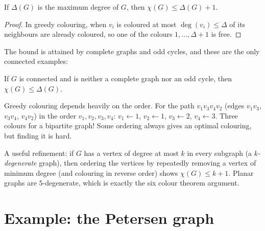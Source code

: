 \begin{theorem}
If $\Delta(G)$ is the maximum degree of $G$, then $\chi(G)\le\Delta(G)+1$.
\end{theorem}
\begin{proof}
In greedy colouring, when $v_i$ is coloured at most $\deg(v_i) \le \Delta$ of its neighbours are
already coloured, so one of the colours $1, \dots, \Delta + 1$ is free.
\end{proof}

The bound is attained by complete graphs and odd cycles, and these are the only connected
examples:

\begin{theorem}
If $G$ is connected and is neither a complete graph nor an odd cycle, then $\chi(G)\le\Delta(G)$.
\end{theorem}

\begin{important}[Pitfall]
Greedy colouring depends heavily on the order. For the path $v_1v_3v_4v_2$ (edges $v_1v_3$,
$v_3v_4$, $v_4v_2$) in the order $v_1, v_2, v_3, v_4$: $v_1 \gets 1$, $v_2 \gets 1$, $v_3 \gets 2$,
$v_4 \gets 3$. Three colours for a bipartite graph! Some ordering always gives an optimal colouring,
but finding it is hard.
\end{important}

\begin{center}
\end{center}

A useful refinement: if $G$ has a vertex of degree at most $k$ in every subgraph (a
\emph{$k$-degenerate} graph), then ordering the vertices by repeatedly removing a vertex of
minimum degree (and colouring in reverse order) shows $\chi(G) \le k + 1$. Planar graphs are
$5$-degenerate, which is exactly the six colour theorem argument.

\section{Example: the Petersen graph}

